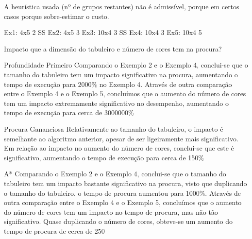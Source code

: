 \documentclass{scrartcl}
\begin{document}
A heurística usada (nº de grupos restantes) não é admissível, porque em certos casos porque sobre-estimar o custo.

Ex1: 4x5 2 SS
Ex2: 4x5 3
Ex3: 10x4 3 SS
Ex4: 10x4 3
Ex5: 10x4 5

Impacto que a dimensão do tabuleiro e número de cores tem na procura?

Profundidade Primeiro
Comparando o Exemplo 2 e o Exemplo 4, conclui-se que o tamanho do tabuleiro tem um impacto significativo na procura, aumentando o tempo de execução para 2000\% no Exemplo 4.
Através de outra comparação entre o Exemplo 4 e o Exemplo 5, concluímos que o aumento do
número de cores tem um impacto extremamente significativo no desempenho, aumentando o tempo
de execução para cerca de 3000000\%

Procura Gananciosa
Relativamente ao tamanho do tabuleiro, o impacto é semelhante ao algoritmo anterior, apesar de ser ligeiramente mais significativo.
Em relação ao impacto no aumento do número de cores, conclui-se que este é significativo,
aumentando o tempo de execução para cerca de 150\%

A*
Comparando o Exemplo 2 e o Exemplo 4, conclui-se que o tamanho do tabuleiro tem um impacto bastante significativo na procura, visto que duplicando o tamanho do tabuleiro, o
tempo de procura aumentou para 1000\%.
Através de outra comparação entre o Exemplo 4 e o Exemplo 5, concluímos que o aumento do
número de cores tem um impacto no tempo de procura, mas não tão significativo.
Quase duplicando o número de cores, obteve-se um aumento do tempo de procura de cerca de 250%
\end{document}
